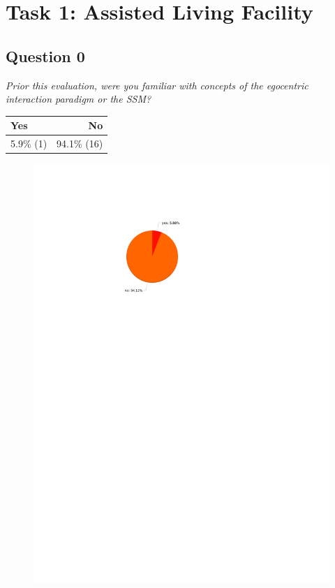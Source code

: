 \section{Task 1: Assisted Living Facility} %
\label{sec:res_alf_task}

\subsection{Question 0}\label{question1:0}
\emph{Prior this evaluation, were you familiar with concepts of the egocentric interaction paradigm or the SSM?}
\begin{table}[H]
	\begin{center}
		\small \begin{tabular*}{0.35\columnwidth}{lr}
			\\ \hline \hline
			Yes & No \\ \hline \hline

		 	5.9\% (1) & 94.1\% (16)\\ \hline
		\end{tabular*}
	\end{center}
\end{table}

\begin{figure}[H]
	\centering
	\includegraphics[width=0.6\linewidth]{gfx/Chapter_EvaluationResults/ALFTask/question0}
\end{figure}

